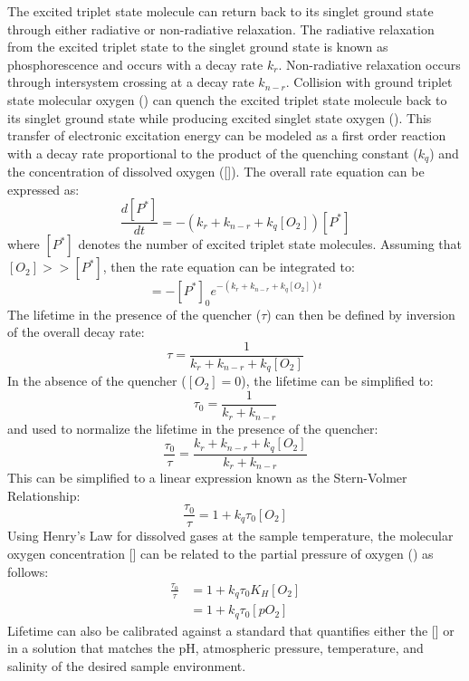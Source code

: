 The excited triplet state molecule can return back to its singlet ground state through either radiative or non-radiative relaxation. The radiative relaxation from the excited triplet state to the singlet ground state is known as phosphorescence and occurs with a decay rate $k_{r}$. Non-radiative relaxation occurs through intersystem crossing at a decay rate $k_{n-r}$. Collision with ground triplet state molecular oxygen () can quench the excited triplet state molecule back to its singlet ground state while producing excited singlet state oxygen (). This transfer of electronic excitation energy can be modeled as a first order reaction with a decay rate proportional to the product of the quenching constant ($k_{q}$) and the concentration of dissolved oxygen ([]).
%
The overall rate equation can be expressed as:
%
\begin{equation}
    \frac{d[P^*]}{dt} = -(k_{r} + k_{n-r} + k_{q}[O_{2}])[P^{*}]
\end{equation}
%
where $[P^{*}]$ denotes the number of excited triplet state molecules. Assuming that $[O_{2}] >> [P^{*}]$, then the rate equation can be integrated to:
%
\begin{equation}
    [P^*] = -[P^{*}]_{0}e^{-(k_{r} + k_{n-r} + k_{q}[O_{2}])t}
\end{equation}
%
The lifetime in the presence of the quencher ($\tau$) can then be defined by inversion of the overall decay rate:
%
\begin{equation}
    \tau = \frac{1}{k_{r} + k_{n-r} + k_{q}[O_{2}]}
\end{equation}
%
In the absence of the quencher ($[O_2] = 0$), the lifetime can be simplified to:
%
\begin{equation}
    \tau_{0} = \frac{1}{k_{r} + k_{n-r}}
\end{equation}
%
and used to normalize the lifetime in the presence of the quencher:
%
\begin{equation}
    \frac{\tau_{0}}{\tau} = \frac{k_{r} + k_{n-r} + k_{q}[O_{2}]}{k_{r} + k_{n-r}}
\end{equation}
%
This can be simplified to a linear expression known as the Stern-Volmer Relationship:
%
\begin{equation}
    \frac{\tau_{0}}{\tau} = 1 + k_{q}\tau_{0}[O_{2}]
\end{equation}
%
Using Henry's Law for dissolved gases at the sample temperature, the molecular oxygen concentration [] can be related to the partial pressure of oxygen () as follows:
%
\begin{equation}
    \begin{split}
        \frac{\tau_{0}}{\tau} & = 1 + k_{q}\tau_{0}K_{H}[O_{2}] \\
        & = 1 + k_{q}\tau_{0}[pO_{2}]
    \end{split}
\end{equation}
%
Lifetime can also be calibrated against a standard that quantifies either the [] or  in a solution that matches the pH, atmospheric pressure, temperature, and salinity of the desired sample environment.
